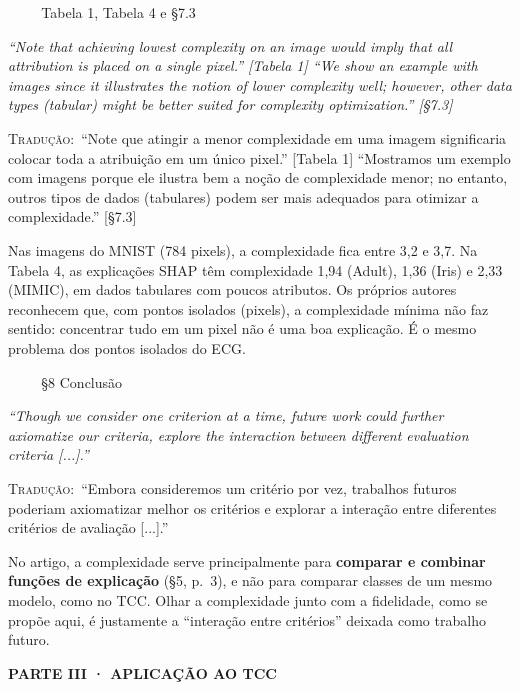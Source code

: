 \documentclass[11pt,a4paper]{article}
\newcommand{\pagechip}[1]{{\setlength{\fboxsep}{1.5pt}\colorbox{cAcc}{\textcolor{white}{\scriptsize\texttt{#1}}}}}
\newcommand{\partbar}[1]{\par\vspace{1.2em}\noindent\colorbox{black!80}{\parbox{\dimexpr\linewidth-2\fboxsep}{\color{white}\bfseries\sffamily\MakeUppercase{#1}}}\par\vspace{0.4em}}
\newenvironment{origquote}{\par\itshape\small}{\par}
\newenvironment{tradquote}{\par\small\textsc{Tradução:}\ }{\par}
\newcommand{\explab}[1]{\par\smallskip{\small\color{cAcc}\textbf{\MakeUppercase{#1}}}\par}
\begin{document}
\begin{citacard}{\pagechip{p. 6} Tabela 1, Tabela 4 e §7.3}
\begin{origquote}“Note that achieving lowest complexity on an image would imply that all attribution is placed on a single pixel.” [Tabela 1] \quad “We show an example with images since it illustrates the notion of lower complexity well; however, other data types (tabular) might be better suited for complexity optimization.” [§7.3]\end{origquote}
\begin{tradquote}“Note que atingir a menor complexidade em uma imagem significaria colocar toda a atribuição em um único pixel.” [Tabela 1] \quad “Mostramos um exemplo com imagens porque ele ilustra bem a noção de complexidade menor; no entanto, outros tipos de dados (tabulares) podem ser mais adequados para otimizar a complexidade.” [§7.3]\end{tradquote}
\explab{Explicação}
Nas imagens do MNIST (784 pixels), a complexidade fica entre 3,2 e 3,7. Na Tabela 4, as explicações SHAP têm complexidade 1,94 (Adult), 1,36 (Iris) e 2,33 (MIMIC), em dados tabulares com poucos atributos. Os próprios autores reconhecem que, com pontos isolados (pixels), a complexidade mínima não faz sentido: concentrar tudo em um pixel não é uma boa explicação. É o mesmo problema dos pontos isolados do ECG.
\end{citacard}

\begin{citacard}{\pagechip{p. 6} §8 Conclusão}
\begin{origquote}“Though we consider one criterion at a time, future work could further axiomatize our criteria, explore the interaction between different evaluation criteria [...].”\end{origquote}
\begin{tradquote}“Embora consideremos um critério por vez, trabalhos futuros poderiam axiomatizar melhor os critérios e explorar a interação entre diferentes critérios de avaliação [...].”\end{tradquote}
\explab{Explicação}
No artigo, a complexidade serve principalmente para \textbf{comparar e combinar funções de explicação} (§5, p.~3), e não para comparar classes de um mesmo modelo, como no TCC. Olhar a complexidade junto com a fidelidade, como se propõe aqui, é justamente a “interação entre critérios” deixada como trabalho futuro.
\end{citacard}

\partbar{Parte III · Aplicação ao TCC}
\end{document}
